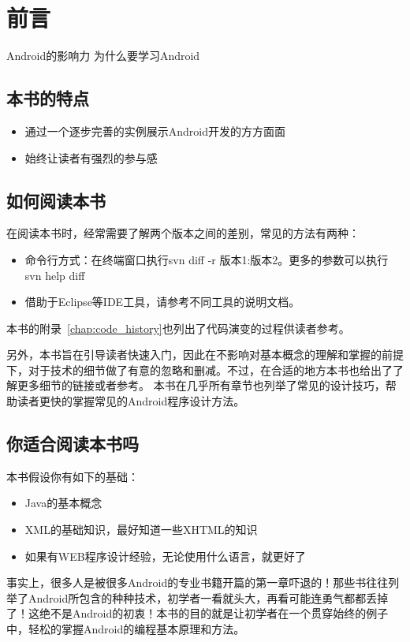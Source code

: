 \frontmatter
\chapter{前言}
Android的影响力 
为什么要学习Android 

\section*{本书的特点}
\begin{itemize}
\item 通过一个逐步完善的实例展示Android开发的方方面面
\item 始终让读者有强烈的参与感
\end{itemize}
\section*{如何阅读本书} 



在阅读本书时，经常需要了解两个版本之间的差别，常见的方法有两种：
\begin{itemize}
\item 命令行方式：在终端窗口执行svn diff -r 版本1:版本2。更多的参数可以执行svn help diff
\item 借助于Eclipse等IDE工具，请参考不同工具的说明文档。
\end{itemize}

本书的附录~\ref{chap:code_history}也列出了代码演变的过程供读者参考。

另外，本书旨在引导读者快速入门，因此在不影响对基本概念的理解和掌握的前提下，对于技术的细节做了有意的忽略和删减。不过，在合适的地方本书也给出了了解更多细节的链接或者参考。
本书在几乎所有章节也列举了常见的设计技巧，帮助读者更快的掌握常见的Android程序设计方法。

\section*{你适合阅读本书吗}
本书假设你有如下的基础：
\begin{itemize}
\item Java的基本概念
\item XML的基础知识，最好知道一些XHTML的知识
\item 如果有WEB程序设计经验，无论使用什么语言，就更好了
\end{itemize}

事实上，很多人是被很多Android的专业书籍开篇的第一章吓退的！那些书往往列举了Android所包含的种种技术，初学者一看就头大，再看可能连勇气都都丢掉了！这绝不是Android的初衷！本书的目的就是让初学者在一个贯穿始终的例子中，轻松的掌握Android的编程基本原理和方法。
